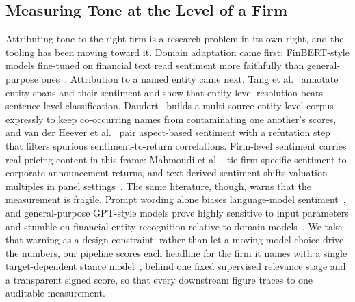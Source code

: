 \documentclass[conference]{IEEEtran}
\begin{document}
\subsection{Measuring Tone at the Level of a Firm}
Attributing tone to the right firm is a research problem in its own right, and the
tooling has been moving toward it. Domain adaptation came first: FinBERT-style models
fine-tuned on financial text read sentiment more faithfully than general-purpose
ones~\cite{araci2019, liu2020}. Attribution to a named entity came next. Tang et
al.~\cite{tang2023} annotate entity spans and their sentiment and show that
entity-level resolution beats sentence-level classification, Daudert~\cite{daudert2021}
builds a multi-source entity-level corpus expressly to keep co-occurring names from
contaminating one another's scores, and van der Heever et al.~\cite{heever2026} pair
aspect-based sentiment with a refutation step that filters spurious sentiment-to-return
correlations. Firm-level sentiment carries real pricing content in this frame: Mahmoudi
et al.~\cite{mahmoudi2022} tie firm-specific sentiment to corporate-announcement
returns, and text-derived sentiment shifts valuation multiples in panel
settings~\cite{ftu2025}. The same literature, though, warns that the measurement is
fragile. Prompt wording alone biases language-model sentiment~\cite{gandhi2025}, and
general-purpose GPT-style models prove highly sensitive to input parameters and stumble
on financial entity recognition relative to domain models~\cite{lseg2023, li2023}. We
take that warning as a design constraint: rather than let a moving model choice drive
the numbers, our pipeline scores each headline for the firm it names with a single
target-dependent stance model~\cite{hamborg2021}, behind one fixed supervised relevance
stage and a transparent signed score, so that every downstream figure traces to one
auditable measurement.
\end{document}

